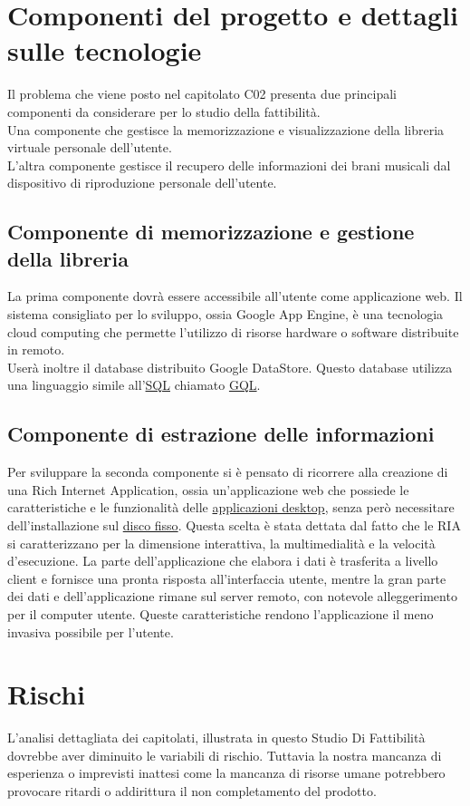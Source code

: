 \section{Componenti del progetto e dettagli sulle tecnologie}
Il problema che viene posto nel capitolato C02 presenta due principali componenti
da considerare per lo studio della fattibilit\`a.\\
Una componente che gestisce la memorizzazione e visualizzazione della libreria
virtuale personale dell'utente.\\
L'altra componente gestisce il recupero delle informazioni dei brani
musicali dal dispositivo di riproduzione personale dell'utente.

\subsection{Componente di memorizzazione e gestione della libreria}
La prima componente dovr\`a essere accessibile all'utente come
applicazione web. Il sistema consigliato per lo sviluppo, ossia Google App Engine, 
\`e una tecnologia cloud computing che permette l'utilizzo di risorse hardware o
 software distribuite in remoto.\\
 User\`a inoltre il database distribuito
 Google DataStore. Questo database utilizza una linguaggio simile
 all'\underline{SQL} chiamato \underline{GQL}.

\subsection{Componente di estrazione delle informazioni}
Per sviluppare la seconda componente si \`e pensato di ricorrere alla creazione
di una Rich Internet Application, ossia un'applicazione web che possiede le
caratteristiche e le funzionalit\`a delle \underline{applicazioni desktop}, senza
per\`o necessitare dell'installazione sul \underline{disco fisso}. Questa scelta
\`e stata dettata dal fatto che le RIA si caratterizzano per la dimensione
interattiva, la multimedialit\`a e la velocit\`a d'esecuzione. La parte
dell'applicazione che elabora i dati \`e trasferita a livello client e fornisce
una pronta risposta all'interfaccia utente, mentre la gran parte dei dati e
dell'applicazione rimane sul server remoto, con notevole alleggerimento per il
computer utente. Queste caratteristiche rendono l'applicazione il meno invasiva
possibile per l'utente.

\section{Rischi}
L'analisi dettagliata dei capitolati, illustrata in questo Studio Di
Fattibilit\`a dovrebbe aver diminuito le variabili di rischio. Tuttavia la
nostra mancanza di esperienza o imprevisti inattesi come la mancanza di
risorse umane potrebbero provocare ritardi o addirittura il non completamento
del prodotto.\\

